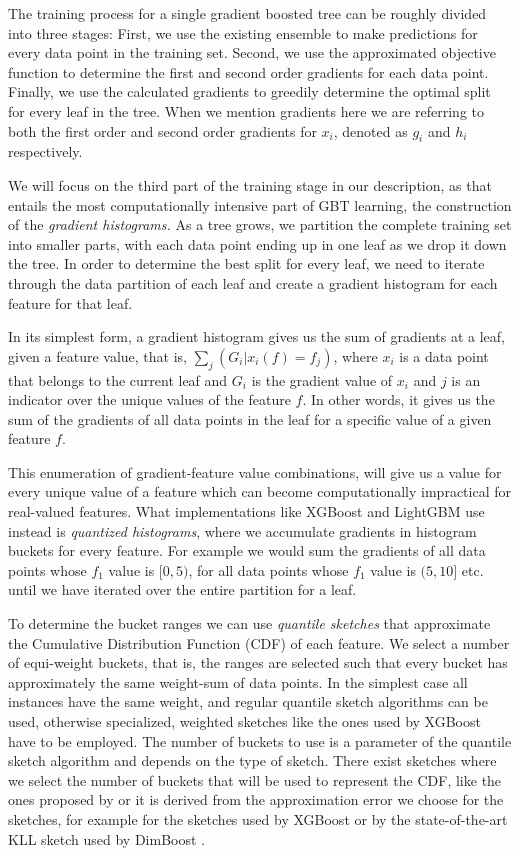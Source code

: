 The training process for a single gradient boosted tree can be roughly divided into three stages:
First, we use the existing ensemble to make predictions for every data point in the training
set. Second, we use the approximated objective function to determine the first and second order
gradients for each data point. Finally, we use the calculated gradients to greedily determine
the optimal split for every leaf in the tree. When we mention gradients here we are referring
to both the first order and second order gradients for $x_i$, denoted as $g_i$ and $h_i$
respectively.

We will focus on the third part of the training stage in our description, as that entails the most
computationally intensive part of GBT learning, the construction of the \emph{gradient histograms.}
As a tree grows, we partition the complete training set into smaller parts, with each data
point ending up in one leaf as we drop it down the tree.
In order to determine the best split for every leaf, we need to iterate through the data
partition of each leaf and create a gradient histogram for each feature for that leaf.

In its simplest form, a gradient histogram gives us the sum of gradients at a leaf,
given a feature value, that is, $\sum_{j}(G_i | x_i(f) = f_j)$, where $x_i$ is a data point
that belongs to the current leaf and  $G_i$ is the gradient value of $x_i$ and $j$ is an
indicator over the unique values of the feature $f$. In other words, it gives us the
sum of the gradients of all data points in the leaf for a specific value of a given
feature $f$.

This enumeration of gradient-feature value combinations, will give us a value for every unique value
of a feature which can become computationally impractical for real-valued features.
What implementations like XGBoost and LightGBM use instead is \emph{quantized histograms},
where we accumulate gradients in histogram buckets for every feature. For example
we would sum the gradients of all data points whose $f_1$ value is $[0, 5)$, for all
data points whose $f_1$ value is $(5, 10]$ etc. until we have iterated over
the entire partition for a leaf.

To determine the bucket ranges we
can use \emph{quantile sketches} \cite{greenwald2016quantiles} that approximate
the Cumulative Distribution Function (CDF) of each feature. We select a number of
equi-weight buckets, that is, the ranges are selected such that every bucket
has approximately the same weight-sum of data points. In the simplest case
all instances have the same weight, and regular quantile sketch algorithms
can be used, otherwise specialized, weighted sketches like the ones used by XGBoost
have to be employed.
The number of buckets to use is a
parameter of the quantile sketch algorithm and depends on the type of sketch.
There exist sketches where we select the number of buckets that
will be used to represent the CDF, like the ones proposed by \citet{BenHaim2010parallel}
or it is derived from the approximation error we choose for the sketches, for example
for the sketches used by XGBoost or by the state-of-the-art KLL sketch \cite{karnin2016kll}
used by DimBoost \cite{dimboost}.


